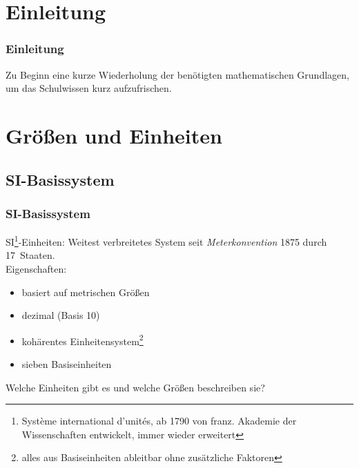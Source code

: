 

\subtitle{Technik Klasse E 01: \\
  Mathematische Grundlagen und Einheiten \\[2em]}


\section{Einleitung}

\begin{frame}
  \frametitle{Einleitung}

  Zu Beginn eine kurze Wiederholung der benötigten mathematischen Grundlagen,
  um das Schulwissen kurz aufzufrischen.
  

\end{frame}

\section{Größen und Einheiten}

\subsection{SI-Basissystem}

\begin{frame}
  \frametitle{SI-Basissystem}

  SI\footnote{Système international d’unités, ab 1790 von franz. Akademie der
  Wissenschaften entwickelt, immer wieder erweitert}-Einheiten: Weitest
  verbreitetes System seit \emph{Meterkonvention} 1875 durch 17~Staaten.
  \\[1em]

  Eigenschaften:

  \begin{itemize}
    \item basiert auf metrischen Größen
    \item dezimal (Basis 10)
    \item kohärentes Einheitensystem\footnote{alles aus Basiseinheiten
      ableitbar ohne zusätzliche Faktoren}
    \item sieben Basiseinheiten
  \end{itemize}

  \bigskip \pause
  Welche Einheiten gibt es und welche Größen beschreiben sie?

\end{frame}

